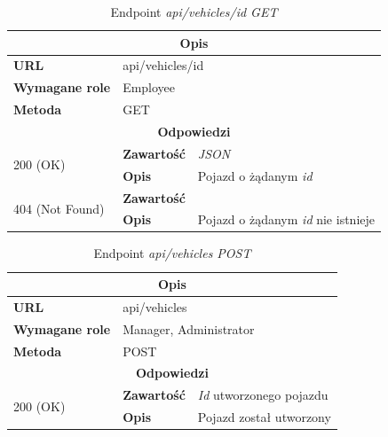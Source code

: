 \documentclass[eng,printmode,openany]{mgr}
\begin{document}
	\begin{table}[H]
		\caption{Endpoint \textit{api/vehicles/id GET}}
		\begin{tabularx}{\textwidth}{|l|l|X|}
			\hline
			\multicolumn{3}{|c|}{\textbf{\textbf{Opis}}}
			\\ \hline
			\textbf{URL}                         & \multicolumn{2}{l|}{api/vehicles/id}
			\\ \hline
			\textbf{Wymagane role}               & \multicolumn{2}{l|}{Employee}
			\\ \hline
			\textbf{Metoda}                      & \multicolumn{2}{l|}{GET}
			\\ \hline
			\multicolumn{3}{|c|}{\textbf{Odpowiedzi}}
			\\ \hline
			\multirow{2}{*}{200 (OK)} 	        & \textbf{Zawartość}   	& \textit{JSON}
			\\ \cline{2-3}                      & \textbf{Opis}         	& Pojazd o żądanym \textit{id}
			\\ \hline
			\multirow{2}{*}{404 (Not Found)} 	& \textbf{Zawartość}     & 
			\\ \cline{2-3}                      & \textbf{Opis}          & Pojazd o żądanym \textit{id} nie istnieje
			\\ \hline
		\end{tabularx}
	\end{table}
	
	\begin{table}[H]
		\caption{Endpoint \textit{api/vehicles POST}}
		\begin{tabularx}{\textwidth}{|l|l|X|}
			\hline
			\multicolumn{3}{|c|}{\textbf{\textbf{Opis}}}
			\\ \hline
			\textbf{URL}                       & \multicolumn{2}{l|}{api/vehicles}
			\\ \hline
			\textbf{Wymagane role}             & \multicolumn{2}{l|}{Manager, Administrator}
			\\ \hline
			\textbf{Metoda}                    & \multicolumn{2}{l|}{POST}
			\\ \hline
			\multicolumn{3}{|c|}{\textbf{Odpowiedzi}}
			\\ \hline
			\multirow{2}{*}{200 (OK)} 		& \textbf{Zawartość}     & \textit{Id} utworzonego pojazdu
			\\ \cline{2-3}                  & \textbf{Opis}         	& Pojazd został utworzony
			\\ \hline
		\end{tabularx}
	\end{table}
	
\end{document}
